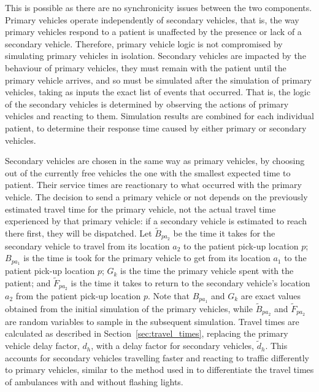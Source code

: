 \documentclass[numbers,webpdf,imaman]{ima-authoring-template}%
\begin{document}
This is possible as there are no synchronicity issues between the two
components. Primary vehicles operate independently of secondary vehicles, that
is, the way primary vehicles respond to a patient is unaffected by the presence
or lack of a secondary vehicle.
Therefore, primary vehicle logic is not compromised by simulating primary
vehicles in isolation.
Secondary vehicles are impacted by the behaviour of primary vehicles, they
must remain with the patient until the primary vehicle arrives, and so must be
simulated after the simulation of primary vehicles, taking as inputs the exact
list of events that occurred. That is, the logic of the secondary vehicles is
determined by observing the actions of primary vehicles and reacting to them.
Simulation results are combined for each individual patient, to determine
their response time caused by either primary or secondary vehicles.

Secondary vehicles are chosen in the same way as primary vehicles, by choosing
out of the currently free vehicles the one with the smallest expected time to
patient. Their service times are reactionary to what occurred with the primary
vehicle. The decision to send a primary vehicle or not depends on the previously
estimated travel time for the primary vehicle, not the actual travel time
experienced by that primary vehicle: if a secondary vehicle is estimated to
reach there first, they will be dispatched.
Let $\tilde{B}_{pa_2}$ be the time it takes for the secondary vehicle to travel
from its location $a_2$ to the patient pick-up location $p$; $B_{pa_1}$ is the
time is took for the primary vehicle to get from its location $a_1$ to the
patient pick-up location $p$; $G_k$ is the time the primary vehicle spent
with the patient; and $\tilde{F}_{pa_2}$ is the time it takes to return to the
secondary vehicle's location $a_2$ from the patient pick-up location $p$.
Note that $B_{pa_1}$ and $G_k$ are exact values obtained from the
initial simulation of the primary vehicles, while $\tilde{B}_{pa_2}$ and
$\tilde{F}_{pa_2}$ are random variables to sample in the subsequent simulation.
Travel times are calculated as described in Section~\ref{sec:travel_times},
replacing the primary vehicle delay factor, $d_h$, with a delay factor for
secondary vehicles, $\tilde{d}_h$. This accounts for secondary vehicles
travelling faster and reacting to traffic differently to primary vehicles,
similar to the method used in \citet{hendersonmason04} to differentiate the
travel times of ambulances with and without flashing lights.
\end{document}
